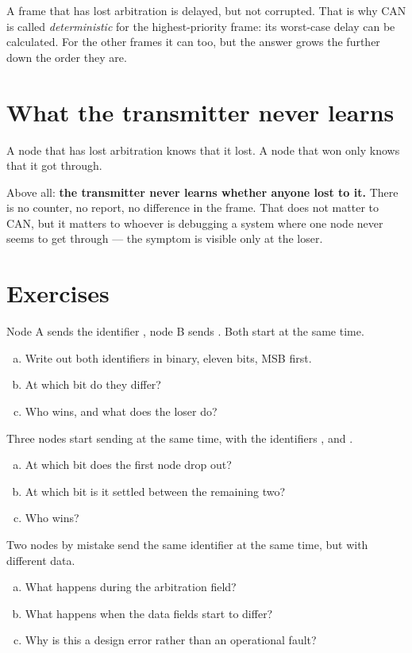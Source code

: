 \begin{aside}
\note A frame that has lost arbitration is delayed, but not corrupted. That is why CAN is called
\emph{deterministic} for the highest-priority frame: its worst-case delay can be calculated. For the
other frames it can too, but the answer grows the further down the order they are.
\end{aside}

\section{What the transmitter never learns}

A node that has lost arbitration knows that it lost. A node that won only knows that it got
through.

Above all: \textbf{the transmitter never learns whether anyone lost to it.} There is no counter, no
report, no difference in the frame. That does not matter to CAN, but it matters to whoever is
debugging a system where one node never seems to get through --- the symptom is visible only at the
loser.

\section*{Exercises}

\label{ex:4:1}
Node A sends the identifier , node B sends . Both start at the same time.
\begin{enumerate}[a)]
  \item Write out both identifiers in binary, eleven bits, MSB first.
  \item At which bit do they differ?
  \item Who wins, and what does the loser do?
\end{enumerate}

\label{ex:4:2}
Three nodes start sending at the same time, with the identifiers ,  and
.
\begin{enumerate}[a)]
  \item At which bit does the first node drop out?
  \item At which bit is it settled between the remaining two?
  \item Who wins?
\end{enumerate}

\label{ex:4:3}
Two nodes by mistake send the same identifier at the same time, but with different data.
\begin{enumerate}[a)]
  \item What happens during the arbitration field?
  \item What happens when the data fields start to differ?
  \item Why is this a design error rather than an operational fault?
\end{enumerate}

